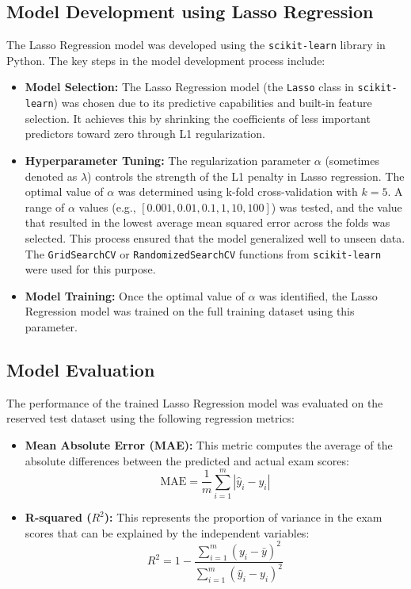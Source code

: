 \documentclass[a4paper,12pt]{article}
\begin{document}
	\subsection{Model Development using Lasso Regression}
	The Lasso Regression model was developed using the \texttt{scikit-learn} library in Python. The key steps in the model development process include:
	
	\begin{itemize}
	\item \textbf{Model Selection:} The Lasso Regression model (the \texttt{Lasso} class in \texttt{scikit-learn}) was chosen due to its predictive capabilities and built-in feature selection. It achieves this by shrinking the coefficients of less important predictors toward zero through L1 regularization.
	
	\item \textbf{Hyperparameter Tuning:} The regularization parameter \( \alpha \) (sometimes denoted as \( \lambda \)) controls the strength of the L1 penalty in Lasso regression. The optimal value of \( \alpha \) was determined using k-fold cross-validation with \( k = 5 \). A range of \( \alpha \) values (e.g., \([0.001, 0.01, 0.1, 1, 10, 100]\)) was tested, and the value that resulted in the lowest average mean squared error across the folds was selected. This process ensured that the model generalized well to unseen data. The \texttt{GridSearchCV} or \texttt{RandomizedSearchCV} functions from \texttt{scikit-learn} were used for this purpose.
	
	\item \textbf{Model Training:} Once the optimal value of \( \alpha \) was identified, the Lasso Regression model was trained on the full training dataset using this parameter.
	\end{itemize}


	\subsection{Model Evaluation}
	The performance of the trained Lasso Regression model was evaluated on the reserved test dataset using the following regression metrics:
	
	\begin{itemize}
		\item \textbf{Mean Absolute Error (MAE):}  
		This metric computes the average of the absolute differences between the predicted and actual exam scores:
		\[\text{MAE} = \frac{1}{m} \sum_{i=1}^{m} \left| \hat{y}_i - y_i \right|\]
		\item \textbf{R-squared (\( R^2 \)):}  
		This represents the proportion of variance in the exam scores that can be explained by the independent variables:
		\[
		R^2 = 1 - \frac{ \sum_{i=1}^{m} (y_i - \bar{y})^2 }{ \sum_{i=1}^{m} (\hat{y}_i - y_i)^2 }
		\]
	\end{itemize}
	
\end{document}
